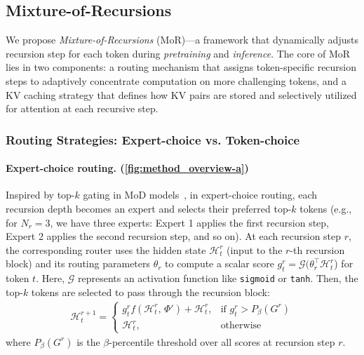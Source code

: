 \subsection{Mixture-of-Recursions}
\label{subsec:mor}

We propose \textit{Mixture-of-Recursions} (MoR)—a framework that dynamically adjusts recursion step for each token during \textit{pretraining} and \textit{inference}. The core of MoR lies in two components: a routing mechanism that assigns token-specific recursion steps to adaptively concentrate computation on more challenging tokens, and a KV caching strategy that defines how KV pairs are stored and selectively utilized for attention at each recursive step.





\subsubsection{Routing Strategies: Expert-choice vs. Token-choice}
\label{subsubsec:routing}


\paragraph{Expert-choice routing. (\autoref{fig:method_overview-a})}
Inspired by top-$k$ gating in MoD models~\citep{raposo2024mixture}, 
in expert-choice routing, each recursion depth becomes an expert and selects their preferred top-$k$ tokens (e.g., for $N_r = 3$, we have three experts: Expert 1 applies the first recursion step, Expert 2 applies the second recursion step, and so on).
At each recursion step $r$, the corresponding router uses the hidden state $\mathcal{H}_t^r$ (input to the $r$-th recursion block) and its routing parameters $\theta_r$ to compute a scalar score $g_t^r = \mathcal{G}(\theta_r^\top \mathcal{H}_t^r$) for token $t$. Here, $\mathcal{G}$ represents an activation function like \texttt{sigmoid} or \texttt{tanh}.
Then, the top-$k$ tokens are selected to pass through the recursion block:
\begin{align}
\mathcal{H}_t^{r+1} =
\begin{cases}
g_t^r f(\mathcal{H}_t^r,\, \Phi') + \mathcal{H}_t^r, & \text{if } g_t^r > P_\beta({G}^r) \\
\mathcal{H}_t^r, & \text{otherwise}
\end{cases}
\end{align}
where $P_\beta({G}^r)$ is the $\beta$-percentile threshold over all scores at recursion step $r$.


